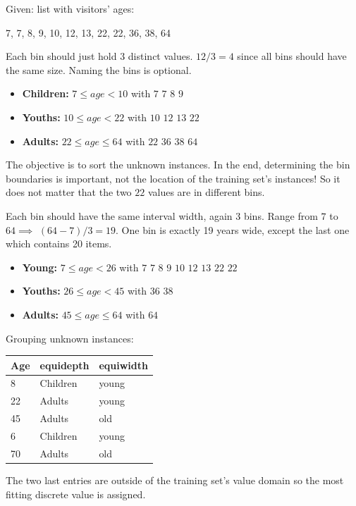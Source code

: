 \begin{breakbox}

Given: list with visitors' ages:

\begin{center}
7, 7, 8, 9, 10, 12, 13, 22, 22, 36, 38, 64
\end{center}

\begin{breakbox}
Each bin should just hold 3 distinct values. $12/3=4$ since all bins should have the same size. Naming the bins is optional.

\begin{itemize}
	\item \textbf{Children:} $7 \leq age < 10$ with $7$ $7$ $8$ $9$
	\item \textbf{Youths:} $10 \leq age < 22$ with $10$ $12$ $13$ $22$
	\item \textbf{Adults:} $22 \leq age \leq 64$ with $22$ $36$ $38$ $64$
\end{itemize}

The objective is to sort the unknown instances. In the end, determining the bin boundaries is important, not the location of the training set's instances! So it does not matter that the two $22$ values are in different bins.
\end{breakbox}



\begin{breakbox}
Each bin should have the same interval width, again 3 bins.  Range from $7$ to $64 \implies$ $(64-7)/3=19$. One bin is exactly 19 years wide, except the last one which contains 20 items.

\begin{itemize}
	\item \textbf{Young:} $7 \leq age < 26$ with $7$ $7$ $8$ $9$ $10$ $12$ $13$ $22$ $22$
	\item \textbf{Youths:} $26 \leq age < 45$ with $36$ $38$
	\item \textbf{Adults:} $45 \leq age \leq 64$ with $64$	
\end{itemize}
\end{breakbox}

Grouping unknown instances:

\begin{tabular}{l|l|l}
\textbf{Age} & \textbf{equidepth} & \textbf{equiwidth} \\
\hline
8   & Children  & young     \\
22  & Adults    & young     \\
45  & Adults    & old       \\
6   & Children  & young     \\
70  & Adults    & old      
\end{tabular}

The two last entries are outside of the training set's value domain so the most fitting discrete value is assigned.
\end{breakbox}



